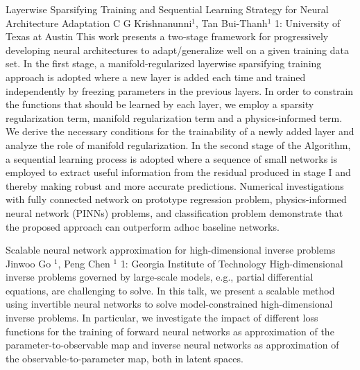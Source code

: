 \vspace{1.5ex}
\abs
{Layerwise Sparsifying Training and Sequential Learning Strategy for Neural Architecture Adaptation}
{C G Krishnanunni$^{1}$, Tan Bui-Thanh$^{1}$}
{1: University of Texas at Austin}
{This work presents a two-stage framework for progressively developing neural architectures to adapt/generalize well on a given training data set.  In the first stage, a manifold-regularized layerwise sparsifying training approach is adopted where a new layer is added each time and trained independently by freezing parameters in the previous layers.  In order to constrain the functions that should be learned by each layer,  we employ a sparsity regularization term, manifold regularization term and a physics-informed term. We derive the necessary conditions for the trainability of a newly added layer and analyze the role of manifold regularization. In the second stage of the Algorithm, a sequential learning process is adopted where a sequence of small networks is employed to extract useful information from the residual produced in stage I and thereby making robust and more accurate predictions. Numerical investigations with fully connected network on prototype regression problem, physics-informed neural network (PINNs) problems, and classification problem demonstrate that the proposed approach can outperform adhoc baseline networks.}


\vspace{1.5ex}
\abs
{Scalable neural network approximation for high-dimensional inverse problems}
{Jinwoo Go $^1$, Peng Chen $^1$}
{1: Georgia Institute of Technology}
{High-dimensional inverse problems governed by large-scale models, e.g., partial differential equations, are challenging to solve. In this talk, we present a scalable method using invertible neural networks to solve model-constrained high-dimensional inverse problems. In particular, we investigate the impact of different loss functions for the training of forward neural networks as approximation of the parameter-to-observable map and inverse neural networks as approximation of the observable-to-parameter map, both in latent spaces.}



